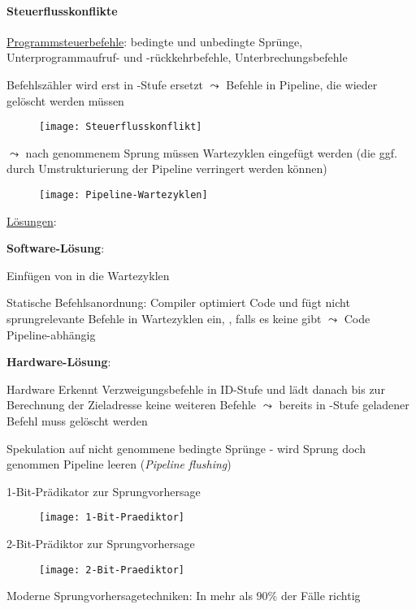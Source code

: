 \paragraph{Steuerflusskonflikte}
\begin{items}
  \item \underline{Programmsteuerbefehle}: bedingte und unbedingte Sprünge, Unterprogrammaufruf- und -rückkehrbefehle, Unterbrechungsbefehle
  \item Befehlszähler wird erst in -Stufe ersetzt \( \leadsto \) Befehle in Pipeline, die wieder gelöscht werden müssen
  \begin{figure}[H]\centering\label{Steuerflusskonflikt}\texttt{[image: Steuerflusskonflikt]}\end{figure}
  \item \( \leadsto \) nach genommenem Sprung müssen Wartezyklen eingefügt werden (die ggf. durch Umstrukturierung der Pipeline verringert werden können)
  \begin{figure}[H]\centering\label{Pipeline-Wartezyklen}\texttt{[image: Pipeline-Wartezyklen]}\end{figure}

  \item \underline{Lösungen}:
  \begin{enumeration}
    \item \textbf{Software-Lösung}:
    \begin{enumeration}
      \item Einfügen von  in die Wartezyklen
      \item Statische Befehlsanordnung: Compiler optimiert Code und fügt nicht sprungrelevante Befehle in Wartezyklen ein, , falls es keine gibt \( \leadsto \) Code Pipeline-abhängig
    \end{enumeration}
    \item \textbf{Hardware-Lösung}:
    \begin{enumeration}
      \item Hardware Erkennt Verzweigungsbefehle in ID-Stufe und lädt danach bis zur Berechnung der Zieladresse keine weiteren Befehle \( \leadsto \) bereits in -Stufe geladener Befehl muss gelöscht werden
      \item Spekulation auf nicht genommene bedingte Sprünge - wird Sprung doch genommen Pipeline leeren (\emph{Pipeline flushing})
      \item 1-Bit-Prädikator zur Sprungvorhersage
      \begin{figure}[H]\centering\label{1-Bit-Praediktor}\texttt{[image: 1-Bit-Praediktor]}\end{figure}
      \item 2-Bit-Prädiktor zur Sprungvorhersage
      \begin{figure}[H]\centering\label{2-Bit-Praediktor}\texttt{[image: 2-Bit-Praediktor]}\end{figure}
      \item Moderne Sprungvorhersagetechniken: In mehr als \( 90\% \) der Fälle richtig
    \end{enumeration}
  \end{enumeration}
\end{items}